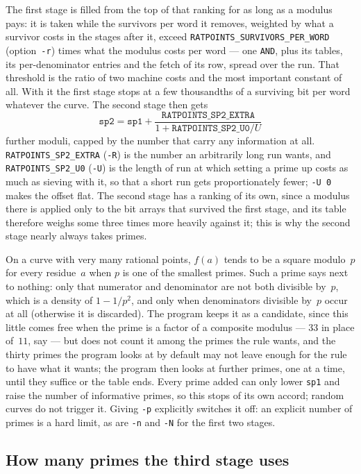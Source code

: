 \documentclass[12pt,a4paper,oneside]{amsart}
\begin{document}
The first stage is filled from the top of that ranking for as long as a
modulus pays: it is taken while the survivors per word it removes, weighted
by what a survivor costs in the stages after it, exceed
\texttt{RATPOINTS\_SURVIVORS\_PER\_WORD} (option~\verb+-r+) times what the
modulus costs per word --- one \texttt{AND}, plus its tables, its
per-denominator entries and the fetch of its row, spread over the run. That
threshold is the ratio of two machine costs and the most important constant
of all. With it the first stage stops at a few thousandths of a surviving
bit per word whatever the curve. The second stage then gets
\[ \texttt{sp2} = \texttt{sp1}
   + \frac{\texttt{RATPOINTS\_SP2\_EXTRA}}{1 + \texttt{RATPOINTS\_SP2\_U0}/U} \]
further moduli, capped by the number that carry any information at all.
\texttt{RATPOINTS\_SP2\_EXTRA} (\verb+-R+) is the number an arbitrarily long
run wants, and \texttt{RATPOINTS\_SP2\_U0} (\verb+-U+) is the length of run
at which setting a prime up costs as much as sieving with it, so that a
short run gets proportionately fewer; \verb+-U 0+ makes the offset flat. The
second stage has a ranking of its own, since a modulus
there is applied only to the bit arrays that survived the first stage, and
its table therefore weighs some three times more heavily against it; this is
why the second stage nearly always takes primes.

On a curve with very many rational points, $f(a)$ tends to be a square
modulo~$p$ for every residue~$a$ when $p$ is one of the smallest primes.
Such a prime says next to nothing: only that numerator and denominator are
not both divisible by~$p$, which is a density of $1 - 1/p^2$, and only when
denominators divisible by~$p$ occur at all (otherwise it is discarded). The
program keeps it as a candidate, since this little comes free when the prime
is a factor of a composite modulus --- $33$ in place of~$11$, say --- but does
not count it among the primes the rule wants,
and the thirty primes the program looks at by default may not leave enough
for the rule to have what it wants; the program then looks at further
primes, one at a time, until they suffice or the table ends. Every prime
added can only lower \texttt{sp1} and raise the number of informative
primes, so this stops of its own accord; random curves do not trigger it.
Giving \verb+-p+ explicitly switches it off: an explicit number of
primes is a hard limit, as are \verb+-n+ and \verb+-N+ for the first two stages.

\subsection{How many primes the third stage uses}\label{sec:sp3choice}
\end{document}
